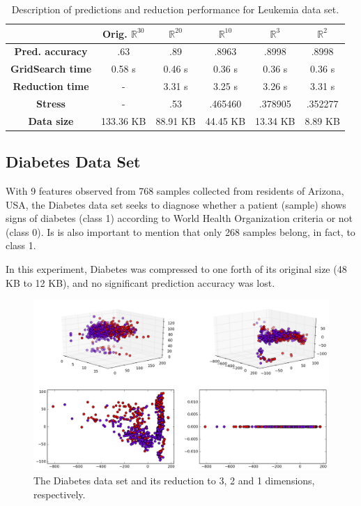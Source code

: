 \documentclass[12pt]{report}
\begin{document}
\begin{table}[H]
	\centering
	\begin{tabular}{|c|c|c|c|c|c|}
		\hline
		& \textbf{Orig. $\mathbb{R}^{30}$} & \textbf{$\mathbb{R}^{20}$} & \textbf{$\mathbb{R}^{10}$} & \textbf{$\mathbb{R}^{3}$} & \textbf{$\mathbb{R}^{2}$} \\\hline
		\textbf{Pred. accuracy}    & .63 & .89 & .8963 & .8998  & .8998 \\\hline
		\textbf{GridSearch time}   & 0.58 s & 0.46 s & 0.36 s & 0.36 s & 0.36 s \\\hline
		\textbf{Reduction time}    & - & 3.31 s & 3.25 s & 3.26 s & 3.31 s \\\hline
		\textbf{Stress} & - & .53 & .465460 & .378905 & .352277 \\\hline
		\textbf{Data size}  & 133.36 KB & 88.91 KB & 44.45 KB & 13.34 KB & 8.89 KB \\\hline
	\end{tabular}
	\captionsetup{justification=centering}
	\caption{Description of predictions and reduction performance for Leukemia data set.}
\end{table}

\newpage
\subsection{Diabetes Data Set}

With 9 features observed from 768 samples collected from residents of Arizona, USA, the Diabetes data set seeks to diagnose whether a patient (sample) shows signs of diabetes (class 1) according to World Health Organization criteria or not (class 0). Is is also important to mention that only 268 samples belong, in fact, to class 1.

In this experiment, Diabetes was compressed to one forth of its original size (48 KB to 12 KB), and no significant prediction accuracy was lost.

\begin{figure}[H]
	\centering
	\includegraphics[width=.85\linewidth]{img/experiments/iso_diabetes}
	\captionsetup{justification=centering}
	\caption{The Diabetes data set and its reduction to 3, 2 and 1 dimensions, respectively.}
	\label{fig:iso_diabetes}
\end{figure}
\end{document}
